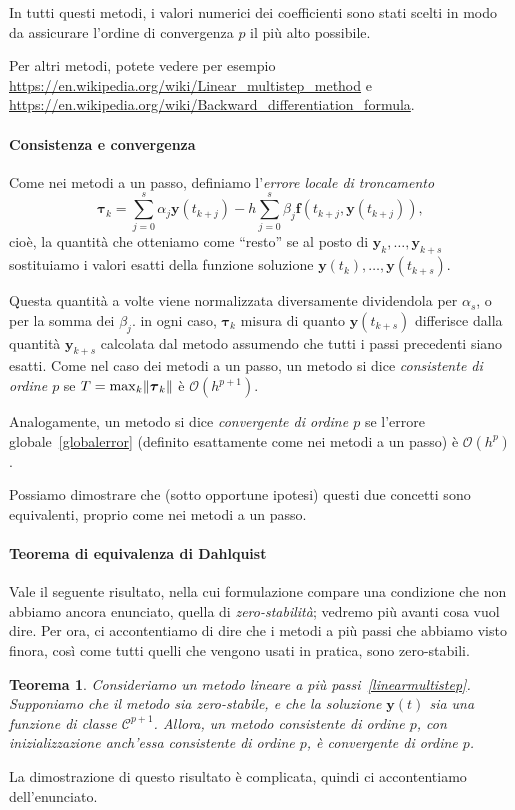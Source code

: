 \documentclass[a4paper]{report}
\DeclarePairedDelimiter{\norm}{\lVert}{\rVert}
\newtheorem{theorem}{Teorema}[chapter]
\theoremstyle{definition}
\theoremstyle{remark}
\newcommand{\y}{\mathbf{y}}
\newcommand{\f}{\mathbf{f}}
\newcommand{\checkkey}[1]{%
        \ifstrequal{#1}{inf}{\setbool{showcontent}{true}}{}%
    }
\newenvironment{conditional}[1][]{%
        \setbool{showcontent}{false}%
        \forcsvlist\checkkey{#1}%
        \ifbool{showcontent}{\begingroup}{\expandafter\comment}%
    }{%
        \ifbool{showcontent}{\endgroup}{\expandafter\endcomment}%
    }
\newcommand{\checkkey}[1]{%
        \ifstrequal{#1}{ich}{\setbool{showcontent}{true}}{}%
    }
\newenvironment{conditional}[1][]{%
        \setbool{showcontent}{false}%
        \forcsvlist\checkkey{#1}%
        \ifbool{showcontent}{\begingroup}{\expandafter\comment}%
    }{%
        \ifbool{showcontent}{\endgroup}{\expandafter\endcomment}%
    }
\begin{document}
\begin{conditional}[ich]
In tutti questi metodi, i valori numerici dei coefficienti sono stati scelti in modo da assicurare l'ordine di convergenza $p$ il più alto possibile.

Per altri metodi, potete vedere per esempio \url{https://en.wikipedia.org/wiki/Linear_multistep_method} e \url{https://en.wikipedia.org/wiki/Backward_differentiation_formula}.

\paragraph{Consistenza e convergenza}

Come nei metodi a un passo, definiamo l'\emph{errore locale di troncamento}
\[
\boldsymbol{\tau}_k = \sum_{j=0}^s \alpha_j \y(t_{k+j}) - h\sum_{j=0}^s \beta_j \f(t_{k+j}, \y(t_{k+j})),
\]
cioè, la quantità che otteniamo come ``resto'' se al posto di $\y_k,\dots,\y_{k+s}$ sostituiamo i valori esatti della funzione soluzione $\y(t_k), \dots, \y(t_{k+s})$.

Questa quantità a volte viene normalizzata diversamente dividendola per $\alpha_s$, o per la somma dei $\beta_j$. in ogni caso, $\boldsymbol{\tau}_k$ misura di quanto $\y(t_{k+s})$ differisce dalla quantità $\y_{k+s}$ calcolata dal metodo assumendo che tutti i passi precedenti siano esatti. Come nel caso dei metodi a un passo, un metodo si dice \emph{consistente di ordine $p$} se $T = \max_{k} \norm{\boldsymbol{\tau}_k}$ è $\mathcal{O}(h^{p+1})$.

Analogamente, un metodo si dice \emph{convergente di ordine $p$} se l'errore globale~\eqref{globalerror} (definito esattamente come nei metodi a un passo) è $\mathcal{O}(h^p)$.

Possiamo dimostrare che (sotto opportune ipotesi) questi due concetti sono equivalenti, proprio come nei metodi a un passo.

\paragraph{Teorema di equivalenza di Dahlquist} Vale il seguente risultato, nella cui formulazione compare una condizione che non abbiamo ancora enunciato, quella di \emph{zero-stabilità}; vedremo più avanti cosa vuol dire. Per ora, ci accontentiamo di dire che i metodi a più passi che abbiamo visto finora, così come tutti quelli che vengono usati in pratica, sono zero-stabili.
\begin{theorem}
Consideriamo un metodo lineare a più passi~\eqref{linearmultistep}. Supponiamo che il metodo sia zero-stabile, e che la soluzione $\y(t)$ sia una funzione di classe $\mathcal{C}^{p+1}$. Allora, un metodo consistente di ordine $p$, con inizializzazione anch'essa consistente di ordine $p$, è convergente di ordine $p$.
\end{theorem}
La dimostrazione di questo risultato è complicata, quindi ci accontentiamo dell'enunciato. 


\end{conditional}
\end{document}
